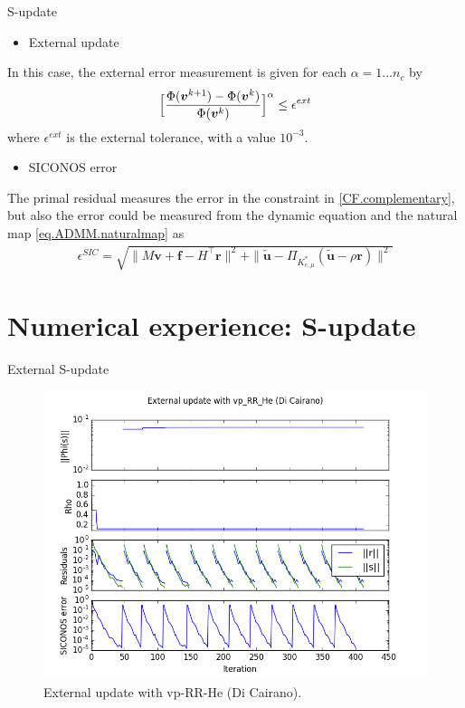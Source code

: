 \documentclass[8pt,red]{beamer}
\theoremstyle{plain}
\theoremstyle{definition}
\theoremstyle{remark}
\newcommand{\bi}[1]{\ensuremath{\boldsymbol{#1}}}
\begin{document}
\begin{frame}{S-update}
\begin{itemize}
\item External update
\end{itemize}
In this case, the external error measurement is given for each $\alpha = 1 ... n_{c}$ by 
\begin{align}
	\Bigl[ \frac{\Phi(\bi{v}^{k+1}) - \Phi(\bi{v}^{k})}{\Phi(\bi{v}^{k})} \Bigr]^{\alpha} \leq \epsilon^{ext} \label{eq.stopcriterionexternal}
\end{align}
where $\epsilon^{ext}$ is the external tolerance, with a value $10^{-3}$.

\begin{itemize}
\item SICONOS error
\end{itemize}
The primal residual measures the error in the constraint in \eqref{CF.complementary}, but also the error could be measured from the dynamic equation and the natural map \eqref{eq.ADMM.naturalmap} as
\begin{align}
\epsilon^{SIC} = \sqrt{\| M \bi{v} + \bi{f} - H^{\top} \bi{r} \|^{2} + \| \tilde{\bi{u}} - \Pi_{K_{e,\mu}^{*}}(\tilde{\bi{u}} - \rho \bi{r}) \|^{2}}
\end{align}
\end{frame}

\section{Numerical experience: S-update}

\begin{frame}{External S-update}
\begin{figure}[hbtp]
\centering
\includegraphics[scale=0.4]{Results/S_update/External13.png}
\caption{External update with vp-RR-He (Di Cairano).}
\end{figure}
\end{frame}
\end{document}
